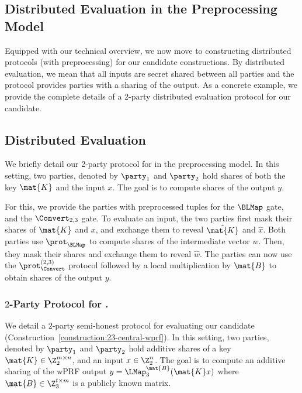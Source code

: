 \iffull
\subsection{Distributed Evaluation in the Preprocessing Model}
\label{subsec:distributed_protocol}
Equipped with our technical overview, we now move to constructing distributed protocols (with preprocessing) for our candidate constructions. By distributed evaluation, we mean that all inputs are secret shared between all parties and the protocol provides parties with a sharing of the output. As a concrete example, we provide the complete details of a 2-party distributed evaluation protocol for our \ttwPRF candidate.
\else
\subsection{Distributed Evaluation}
\label{subsec:distributed_protocol}
\label{subsec:2pc-wprf}
We briefly detail our 2-party protocol for \ttwPRF in the preprocessing model. In this setting, two parties, denoted by $\party_1$ and $\party_2$ hold shares of both the key $\mat{K}$ and the input $x$. The goal is to compute shares of the output $y$.

For this, we provide the parties with preprocessed tuples for the $\BLMap$ gate, and the $\Convert_{2,3}$ gate. To evaluate an input, the two parties first mask their shares of $\mat{K}$ and $x$, and exchange them to reveal $\hat{\mat{K}}$ and $\hat{x}$. Both parties use $\prot_\BLMap$ to compute shares of the intermediate vector $w$. Then, they mask their shares and exchange them to reveal $\hat{w}$. The parties can now use the $\prot_\Convert^{(2,3)}$ protocol followed by a local multiplication by $\mat{B}$ to obtain shares of the output $y$.
\fi



\iffull
\subsubsection{$2$-Party Protocol for \ttwPRF.}
\label{subsec:2pc-wprf}
We detail a $2$-party semi-honest protocol for evaluating our \ttwPRF candidate (Construction~\ref{construction:23-central-wprf}). In this setting, two parties, denoted by $\party_1$ and $\party_2$ hold additive shares of a key $\mat{K} \in \Z_2^{m \times n}$, and an input $x \in \Z_2^n$. The goal is to compute an additive sharing of the wPRF output $y = \LMap^\mat{B}_3(\mat{K}x)$ where $\mat{B} \in \Z_3^{t \times m}$ is a publicly known matrix.


